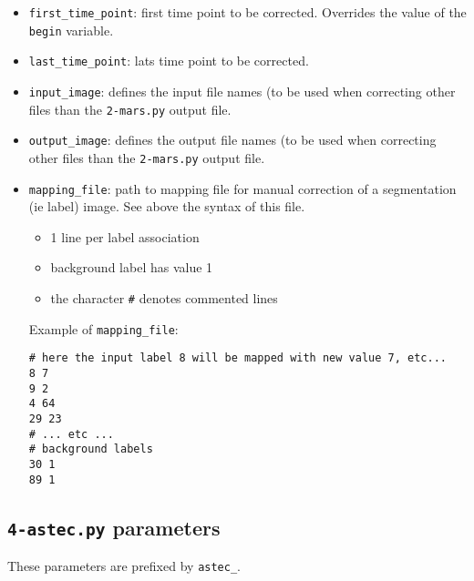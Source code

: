 \begin{itemize}
\itemsep -0.5ex
\item \texttt{first\_time\_point}:
  first time point to be corrected.
  Overrides the value of the \texttt{begin} variable.
\item \texttt{last\_time\_point}:
  lats time point to be corrected.
\item \texttt{input\_image}:
  defines the input file names (to be used when correcting
  other files than the \texttt{2-mars.py} output file.
\item \texttt{output\_image}:
  defines the output file names (to be used when correcting
  other files than the \texttt{2-mars.py} output file.
\item \texttt{mapping\_file}:
  path to mapping file for manual correction of a segmentation (ie label)
  image. See above the syntax of this file.
  \begin{itemize}
  \itemsep -0.5ex
  \item 1 line per label association
  \item background label has value 1
  \item the character \texttt{\#} denotes commented lines 
  \end{itemize}
  Example of \texttt{mapping\_file}:
\begin{verbatim}
# here the input label 8 will be mapped with new value 7, etc...
8 7
9 2  
4 64 
29 23
# ... etc ...
# background labels
30 1 
89 1 
\end{verbatim}
\end{itemize}










\subsection{\texttt{4-astec.py} parameters}
\label{sec:cli:parameters:astec}


These parameters are prefixed by \texttt{astec\_}.
 
